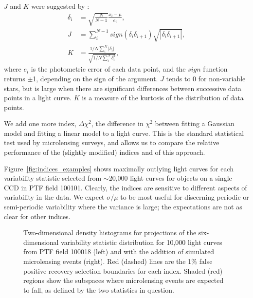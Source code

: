 \documentclass{emulateapj}
\begin{document}
$J$ and $K$ were suggested by \cite{stetson1996}:
\begin{align}
	\delta_i &= \sqrt{\frac{N}{N-1}}\frac{x_i-\mu}{e_i},\\
	J &= \sum^{N-1}_i sign(\delta_i \delta_{i+1})\sqrt{|\delta_i \delta_{i+1}|},\\
	K &= \frac{1/N\sum^N_i |\delta_i|}{\sqrt{1/N\sum^N_i\delta_i^2}},
\end{align}
where $e_i$ is the photometric error of each data point, and the $sign$ function returns $\pm$1, depending on the sign of the argument. $J$ tends to 0 for non-variable stars, but is large when there are significant differences between successive data points in a light curve. $K$ is a measure of the kurtosis of the distribution of data points.

We add one more index, $\Delta \chi^2$, the difference in $\chi^2$ between fitting a Gaussian model and fitting a linear model to a light curve. This is the standard statistical test used by microlensing surveys, and allows us to compare the relative performance of the (slightly modified) \cite{shin2009} indices and of this approach. 

Figure~\ref{fig:indices_examples} shows maximally outlying light curves for each variability statistic selected from $\sim$20,000 light curves for objects on a single CCD in PTF field 100101. %
Clearly, the indices are sensitive to different aspects of variability in the data. We expect $\sigma/\mu$ to be most useful for discerning periodic or semi-periodic variability where the variance is large; the expectations are not as clear for other indices. 

\begin{figure}[h]
\centering
	
	
	\caption{Two-dimensional density histograms for projections of the six-dimensional variability statistic distribution for 10,000 light curves from PTF field 100018 (left) and with the addition of simulated microlensing events (right). Red (dashed) lines are the 1\% false positive recovery selection boundaries for each index. Shaded (red) regions show the subspaces where microlensing events are expected to fall, as defined by the two statistics in question. } 
	\label{fig:var_indices}
\end{figure}
\end{document}
